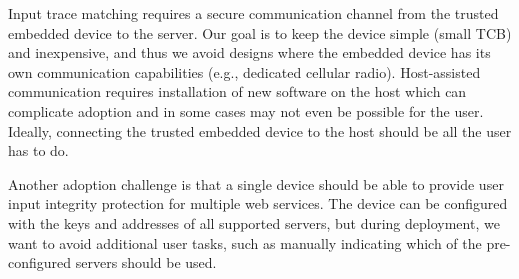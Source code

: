  Input trace matching requires a secure communication channel from the trusted embedded device to the server. Our goal is to keep the device simple (small TCB) and inexpensive, and thus we avoid designs where the embedded device has its own communication capabilities (e.g., dedicated cellular radio). Host-assisted communication requires installation of new software on the host which can complicate adoption and in some cases may not even be possible for the user. Ideally, connecting the trusted embedded device to the host should be all the user has to do.

Another adoption challenge is that a single device should be able to provide user input integrity protection for multiple web services. The device can be configured with the keys and addresses of all supported servers, but during deployment, we want to avoid additional user tasks, such as manually indicating which of the pre-configured servers should be used.



